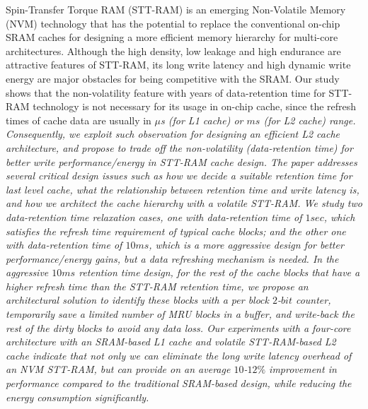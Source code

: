 
Spin-Transfer Torque RAM (STT-RAM) is an emerging Non-Volatile Memory (NVM)
technology that has the potential to replace the conventional
on-chip SRAM caches for designing a more efficient memory hierarchy for
multi-core architectures. Although the high density, low leakage and high endurance are attractive features of STT-RAM,
its long write latency and high dynamic write energy are major obstacles for being competitive with the SRAM.
Our study shows that the non-volatility feature with years of data-retention time for STT-RAM technology is not necessary for its usage in on-chip cache, since the refresh times of cache data are usually in  \it{$\mu$s} (for L1 cache) or $ms$ (for L2 cache) range. Consequently,  we exploit such observation for designing an efficient L2 cache
architecture, and propose to trade off the non-volatility (data-retention time)
for better write performance/energy in STT-RAM cache design. The paper addresses several critical design issues such as how we decide a suitable retention time for last level cache,
what the relationship between retention time and write latency is,
and how we architect the cache hierarchy with a volatile STT-RAM.
We study two
data-retention time relaxation cases, one with data-retention time of  $1sec$, which satisfies the refresh time requirement of typical cache blocks; and the other one with data-retention time of $10ms$, which is a more aggressive design for better performance/energy gains, but a data refreshing mechanism is needed.
In the aggressive $10ms$ retention time design, for the rest of the cache blocks that have a higher refresh time
than the STT-RAM retention time, we propose an architectural solution to identify these blocks
with a per block $2$-$bit$ counter, temporarily save a limited number of MRU blocks in a buffer,
and write-back the rest of the dirty blocks to avoid any data loss.
Our experiments with a four-core architecture with an SRAM-based L1 cache and volatile STT-RAM-based L2 cache
indicate that not only we can eliminate the long write latency overhead of an NVM STT-RAM, but can provide
on an average $10$-$12\%$ improvement in performance compared to the traditional SRAM-based
design, while reducing the energy consumption significantly.

